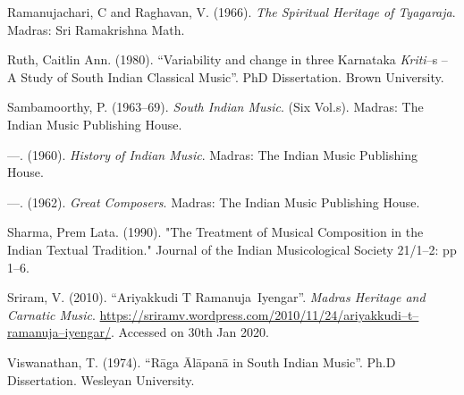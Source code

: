 \begin{thebibliography}{99}
  Ramanujachari, C and Raghavan, V. (1966). \textit{The Spiritual Heritage of Tyagaraja}. Madras: Sri Ramakrishna Math.

  Ruth, Caitlin Ann. (1980). “Variability and change in three Karnataka \textit{Kriti}–s – A Study of South Indian Classical Music”. PhD Dissertation. Brown University.

  Sambamoorthy, P. (1963–69). \textit{South Indian Music}. (Six Vol.s). Madras: The Indian Music Publishing House.

  —. (1960). \textit{History of Indian Music}. Madras: The Indian Music Publishing House.

  —. (1962). \textit{Great Composers}. Madras: The Indian Music Publishing House.

  Sharma, Prem Lata. (1990). "The Treatment of Musical Composition in the Indian Textual Tradition." Journal of the Indian Musicological Society 21/1–2: pp 1–6.

  Sriram, V. (2010). “Ariyakkudi T Ramanuja Iyengar”. \textit{Madras Heritage and Carnatic Music}. \url{https://sriramv.wordpress.com/2010/11/24/ariyakkudi–t–ramanuja–iyengar/}. Accessed on 30th Jan 2020.

  Viswanathan, T. (1974). “Rāga Ālāpanā in South Indian Music”. Ph.D Dissertation. Wesleyan University.

 \end{thebibliography}

